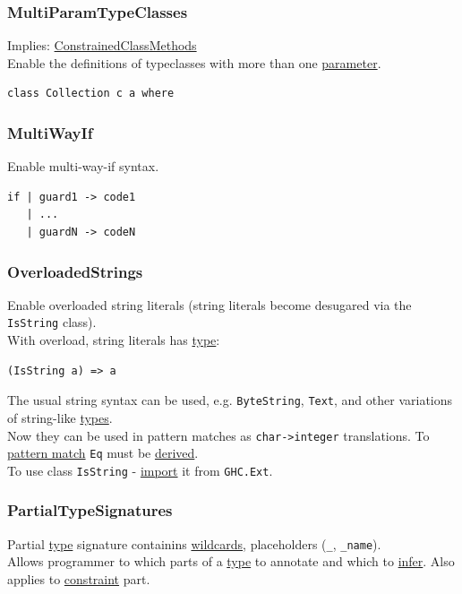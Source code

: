 \documentclass[a4paper,14pt,oneside]{book}
\begin{document}
\subsubsection{\label{orgc346d14}MultiParamTypeClasses}
\label{sec:org1aa9c43}
Implies: \hyperref[org3dd74f8]{ConstrainedClassMethods}\\
Enable the definitions of typeclasses with more than one \hyperref[org38d67b0]{parameter}.\\
\begin{verbatim}
class Collection c a where
\end{verbatim}

\subsubsection{\label{orgb15003e}MultiWayIf}
\label{sec:orgbd7205d}
Enable multi-way-if syntax.\\
\begin{verbatim}
if | guard1 -> code1
   | ...
   | guardN -> codeN
\end{verbatim}

\subsubsection{\label{org4a543a0}OverloadedStrings}
\label{sec:org6bfa78a}
Enable overloaded string literals (string literals become desugared via the \texttt{IsString} class).\\

With overload, string literals has \hyperref[org38dea24]{type}:\\
\begin{verbatim}
(IsString a) => a
\end{verbatim}

The usual string syntax can be used, e.g. \texttt{ByteString}, \texttt{Text}, and other variations of string-like \hyperref[orgb6d8f90]{types}.\\
Now they can be used in pattern matches as \texttt{char->integer} translations. To \hyperref[org3f40173]{pattern match} \texttt{Eq} must be \hyperref[org364c577]{derived}.\\

To use class \texttt{IsString} - \hyperref[org648e3f6]{import} it from \texttt{GHC.Ext}.\\

\subsubsection{\label{org0756aea}PartialTypeSignatures}
\label{sec:org158ccee}
Partial \hyperref[org38dea24]{type} signature containins \hyperref[org8b59d11]{wildcards}, placeholders (\texttt{\_}, \texttt{\_name}).\\
Allows programmer to which parts of a \hyperref[org38dea24]{type} to annotate and which to \hyperref[org519e024]{infer}. Also applies to \hyperref[orga0f9c8f]{constraint} part.\\
\end{document}
